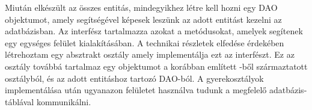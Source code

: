Miután elkészült az összes entitás, mindegyikhez létre kell hozni egy DAO objektumot, amely segítségével képesek leszünk az adott entitást kezelni az adatbázisban. 
Az  interfész tartalmazza azokat a metódusokat, amelyek segítenek egy egységes felület kialakításában. 
A technikai részletek elfedése érdekében létrehoztam egy absztrakt  osztály amely implementálja ezt az interfészt. 
Ez az osztály továbbá tartalmaz egy objektumot a korábban említett -ből származtatott osztályból, és az adott entitáshoz tartozó DAO-ból.
A gyerekosztályok implementálása után ugyanazon felületet használva tudunk a megfelelő adatbázis-táblával kommunikálni. 







